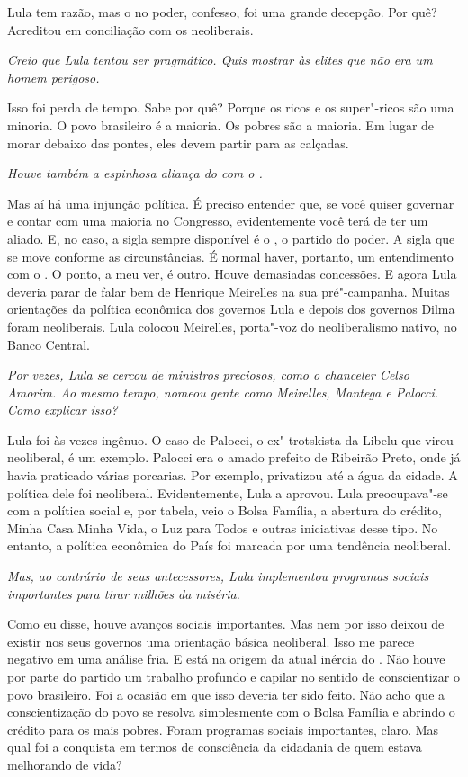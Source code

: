 \normalfont
Lula tem razão, mas o  no poder, confesso, foi uma
grande decepção. Por quê? Acreditou em conciliação com os neoliberais.

\itshape
 Creio que Lula tentou ser pragmático. Quis mostrar às
elites que não era um homem perigoso.

\normalfont
Isso foi perda de tempo. Sabe por quê? Porque os ricos e
os super"-ricos são uma minoria. O povo brasileiro é a maioria. Os pobres
são a maioria. Em lugar de morar debaixo das pontes, eles devem partir
para as calçadas.

\itshape
 Houve também a espinhosa aliança do  com o .

\normalfont
Mas aí há uma injunção política. É preciso entender que,
se você quiser governar e contar com uma maioria no Congresso,
evidentemente você terá de ter um aliado. E, no caso, a sigla sempre
disponível é o , o partido do poder. A sigla que se move conforme as
circunstâncias. É normal haver, portanto, um entendimento com o . O
ponto, a meu ver, é outro. Houve demasiadas concessões. E agora Lula
deveria parar de falar bem de Henrique Meirelles na sua pré"-campanha.
Muitas orientações da política econômica dos governos Lula e depois dos
governos Dilma foram neoliberais. Lula colocou Meirelles, porta"-voz do
neoliberalismo nativo, no Banco Central.

\itshape
 Por vezes, Lula se cercou de ministros preciosos, como
o chanceler Celso Amorim. Ao mesmo tempo, nomeou gente como Meirelles,
Mantega e Palocci. Como explicar isso?

\normalfont
Lula foi às vezes ingênuo. O caso de Palocci, o
ex"-trotskista da Libelu que virou neoliberal, é um exemplo. Palocci era
o amado prefeito de Ribeirão Preto, onde já havia praticado várias
porcarias. Por exemplo, privatizou até a água da cidade. A política dele
foi neoliberal. Evidentemente, Lula a aprovou. Lula preocupava"-se com a
política social e, por tabela, veio o Bolsa Família, a abertura do
crédito, Minha Casa Minha Vida, o Luz para Todos e outras iniciativas
desse tipo. No entanto, a política econômica do País foi marcada por uma
tendência neoliberal.

\itshape
 Mas, ao contrário de seus antecessores, Lula
implementou programas sociais importantes para tirar milhões da miséria.

\normalfont
Como eu disse, houve avanços sociais importantes. Mas nem
por isso deixou de existir nos seus governos uma orientação básica
neoliberal. Isso me parece negativo em uma análise fria. E está na
origem da atual inércia do . Não houve por parte do partido um
trabalho profundo e capilar no sentido de conscientizar o povo
brasileiro. Foi a ocasião em que isso deveria ter sido feito. Não acho
que a conscientização do povo se resolva simplesmente com o Bolsa
Família e abrindo o crédito para os mais pobres. Foram programas sociais
importantes, claro. Mas qual foi a conquista em termos de consciência da
cidadania de quem estava melhorando de vida?

